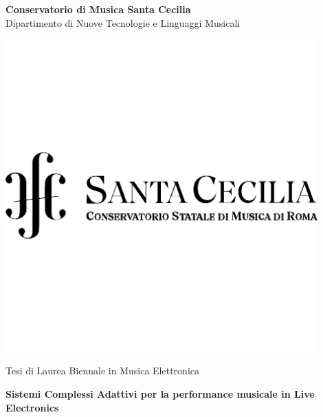 \begin{center}
{\LARGE \textbf{Conservatorio di Musica Santa Cecilia}} \\
\vspace{0.2cm}
{\Large {Dipartimento di Nuove Tecnologie e Linguaggi
Musicali}} \\ 
\vspace{1cm}

\includegraphics[width=12cm]{figures/logo-CSC-pdf-cropped.pdf} \\
\vspace{0.8cm}

{\Large {Tesi di Laurea Biennale in Musica Elettronica}} \\
\vspace{1cm}

{\LARGE \textbf{Sistemi Complessi Adattivi per la performance musicale in Live Electronics}} \\ 
\vspace{1cm}

\end{center}

